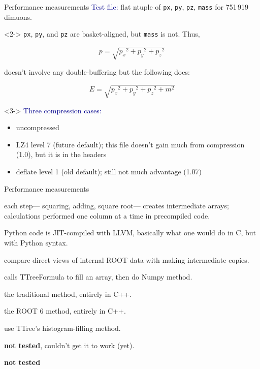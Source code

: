 \documentclass{beamer}
\begin{document}
\begin{frame}{Performance measurements}
\vspace{0.5 cm}
\textcolor{darkblue}{Test file:} flat ntuple of {\tt px}, {\tt py}, {\tt pz}, {\tt mass} for 751\,919 dimuons.

\vspace{0.75 cm}
\begin{uncoverenv}<2->
{\tt px}, {\tt py}, and {\tt pz} are basket-aligned, but {\tt mass} is not. Thus,

\[ p = \sqrt{{p_x}^2 + {p_y}^2 + {p_z}^2} \]

doesn't involve any double-buffering but the following does:

\[ E = \sqrt{{p_x}^2 + {p_y}^2 + {p_z}^2 + m^2} \]
\end{uncoverenv}

\begin{uncoverenv}<3->
\textcolor{darkblue}{Three compression cases:}
\begin{itemize}
\item uncompressed
\item LZ4 level 7 (future default); this file doesn't gain much from compression (1.0), but it is in the headers
\item deflate level 1 (old default); still not much advantage (1.07)
\end{itemize}
\end{uncoverenv}
\end{frame}

\begin{frame}{Performance measurements}
\vspace{0.25 cm}
\begin{description}\setlength{\itemsep}{0.15 cm}
\item[Numpy:] each step--- squaring, adding, square root--- creates intermediate arrays; calculations performed one column at a time in precompiled code.

\item[Numba:] Python code is JIT-compiled with LLVM, basically what one would do in C, but with Python syntax.

\item[view/copy:] compare direct views of internal ROOT data with making intermediate copies.

\item[root\_numpy:] calls TTreeFormula to fill an array, then do Numpy method.

\item[SetBranchAddress:] the traditional method, entirely in C++.

\item[TTreeReader:] the ROOT 6 method, entirely in C++.

\item[TTree::Draw:] use TTree's histogram-filling method.

\item[BulkIO in C++:] {\bf not tested}, couldn't get it to work (yet).

\item[TDataFrame:] {\bf not tested}

\end{description}
\end{frame}
\end{document}
